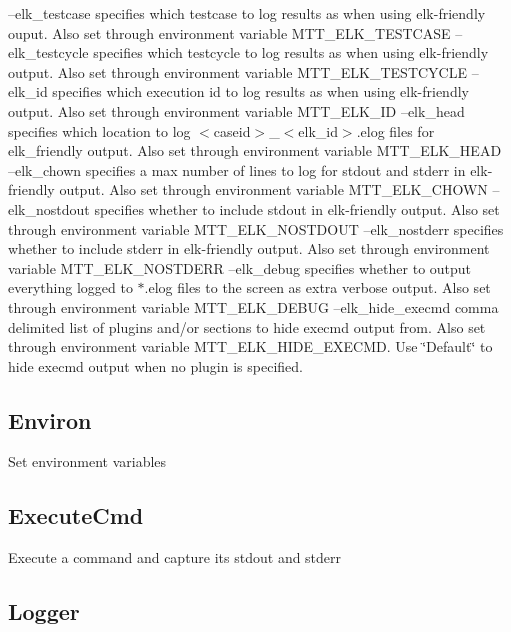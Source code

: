 --elk\-\_\-testcase specifies which testcase to log results as when using elk-\/friendly ouput. Also set through environment variable M\-T\-T\-\_\-\-E\-L\-K\-\_\-\-T\-E\-S\-T\-C\-A\-S\-E --elk\-\_\-testcycle specifies which testcycle to log results as when using elk-\/friendly output. Also set through environment variable M\-T\-T\-\_\-\-E\-L\-K\-\_\-\-T\-E\-S\-T\-C\-Y\-C\-L\-E --elk\-\_\-id specifies which execution id to log results as when using elk-\/friendly output. Also set through environment variable M\-T\-T\-\_\-\-E\-L\-K\-\_\-\-I\-D --elk\-\_\-head specifies which location to log $<$caseid$>$\-\_\-$<$elk\-\_\-id$>$.\-elog files for elk\-\_\-friendly output. Also set through environment variable M\-T\-T\-\_\-\-E\-L\-K\-\_\-\-H\-E\-A\-D --elk\-\_\-chown specifies a max number of lines to log for stdout and stderr in elk-\/friendly output. Also set through environment variable M\-T\-T\-\_\-\-E\-L\-K\-\_\-\-C\-H\-O\-W\-N --elk\-\_\-nostdout specifies whether to include stdout in elk-\/friendly output. Also set through environment variable M\-T\-T\-\_\-\-E\-L\-K\-\_\-\-N\-O\-S\-T\-D\-O\-U\-T --elk\-\_\-nostderr specifies whether to include stderr in elk-\/friendly output. Also set through environment variable M\-T\-T\-\_\-\-E\-L\-K\-\_\-\-N\-O\-S\-T\-D\-E\-R\-R --elk\-\_\-debug specifies whether to output everything logged to $\ast$.elog files to the screen as extra verbose output. Also set through environment variable M\-T\-T\-\_\-\-E\-L\-K\-\_\-\-D\-E\-B\-U\-G --elk\-\_\-hide\-\_\-execmd comma delimited list of plugins and/or sections to hide execmd output from. Also set through environment variable M\-T\-T\-\_\-\-E\-L\-K\-\_\-\-H\-I\-D\-E\-\_\-\-E\-X\-E\-C\-M\-D. Use \char`\"{}\-Default\char`\"{} to hide execmd output when no plugin is specified.\hypertarget{group___utilities_Environ}{}\subsection{Environ}\label{group___utilities_Environ}
Set environment variables\hypertarget{group___utilities_ExecuteCmd}{}\subsection{Execute\-Cmd}\label{group___utilities_ExecuteCmd}
Execute a command and capture its stdout and stderr\hypertarget{group___utilities_Logger}{}\subsection{Logger}\label{group___utilities_Logger}
